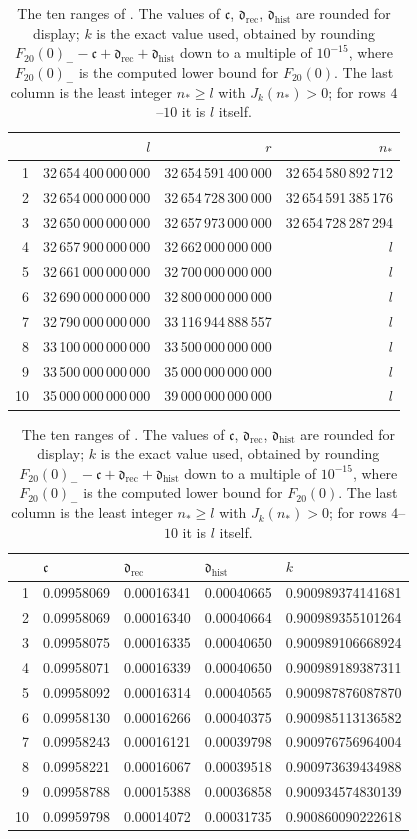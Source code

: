 \documentclass[11pt,colorlinks]{charlie}
\begin{document}
\begin{table}[ht]
\centering\small
\begin{tabular}{@{}rrrr@{}}
\toprule
& $l$ & $r$ & $n_*$\\
\midrule
1 & 32\,654\,400\,000\,000 & 32\,654\,591\,400\,000 & 32\,654\,580\,892\,712\\
2 & 32\,654\,000\,000\,000 & 32\,654\,728\,300\,000 & 32\,654\,591\,385\,176\\
3 & 32\,650\,000\,000\,000 & 32\,657\,973\,000\,000 & 32\,654\,728\,287\,294\\
4 & 32\,657\,900\,000\,000 & 32\,662\,000\,000\,000 & $l$\\
5 & 32\,661\,000\,000\,000 & 32\,700\,000\,000\,000 & $l$\\
6 & 32\,690\,000\,000\,000 & 32\,800\,000\,000\,000 & $l$\\
7 & 32\,790\,000\,000\,000 & 33\,116\,944\,888\,557 & $l$\\
8 & 33\,100\,000\,000\,000 & 33\,500\,000\,000\,000 & $l$\\
9 & 33\,500\,000\,000\,000 & 35\,000\,000\,000\,000 & $l$\\
10 & 35\,000\,000\,000\,000 & 39\,000\,000\,000\,000 & $l$\\
\bottomrule
\end{tabular}

\medskip
\begin{tabular}{@{}rllll@{}}
\toprule
& $\mathfrak c$ & $\mathfrak d_{\mathrm{rec}}$ & $\mathfrak d_{\mathrm{hist}}$ & $k$\\
\midrule
1 & 0.09958069 & 0.00016341 & 0.00040665 & 0.900989374141681\\
2 & 0.09958069 & 0.00016340 & 0.00040664 & 0.900989355101264\\
3 & 0.09958075 & 0.00016335 & 0.00040650 & 0.900989106668924\\
4 & 0.09958071 & 0.00016339 & 0.00040650 & 0.900989189387311\\
5 & 0.09958092 & 0.00016314 & 0.00040565 & 0.900987876087870\\
6 & 0.09958130 & 0.00016266 & 0.00040375 & 0.900985113136582\\
7 & 0.09958243 & 0.00016121 & 0.00039798 & 0.900976756964004\\
8 & 0.09958221 & 0.00016067 & 0.00039518 & 0.900973639434988\\
9 & 0.09958788 & 0.00015388 & 0.00036858 & 0.900934574830139\\
10 & 0.09959798 & 0.00014072 & 0.00031735 & 0.900860090222618\\
\bottomrule
\end{tabular}
\caption{The ten ranges of . The values of $\mathfrak c$, $\mathfrak d_{\mathrm{rec}}$, $\mathfrak d_{\mathrm{hist}}$ are rounded for display; $k$ is the exact value used, obtained by rounding $F_{20}(0)_--\mathfrak c+\mathfrak d_{\mathrm{rec}}+\mathfrak d_{\mathrm{hist}}$ down to a multiple of $10^{-15}$, where $F_{20}(0)_-$ is the computed lower bound for $F_{20}(0)$. The last column is the least integer $n_*\ge l$ with $J_k(n_*)>0$; for rows $4$--$10$ it is $l$ itself.}\label{tab:slabs}
\end{table}
\end{document}
